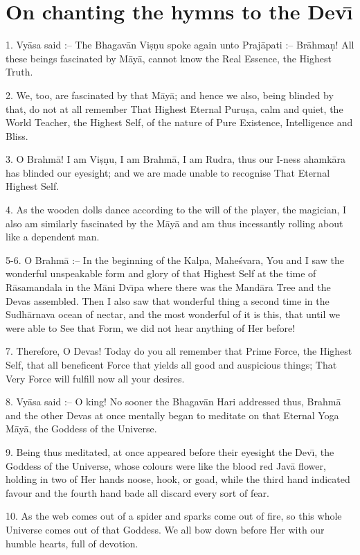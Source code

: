 \chapter{On chanting the hymns to the Dev\={\i}}

1. Vy\=asa said :-- The Bhagav\=an Vi\d{s}\d{n}u spoke again unto Praj\=apati :-- Br\=ahma\d{n}! All these beings fascinated by M\=ay\=a, cannot know the Real Essence, the Highest Truth.

2. We, too, are fascinated by that M\=ay\=a; and hence we also, being blinded by that, do not at all remember That Highest Eternal Puru\d{s}a, calm and quiet, the World Teacher, the Highest Self, of the nature of Pure Existence, Intelligence and Bliss.

3. O Brahm\=a! I am Vi\d{s}\d{n}u, I am Brahm\=a, I am Rudra, thus our I-ness ahamk\=ara has blinded our eyesight; and we are made unable to recognise That Eternal Highest Self.

4. As the wooden dolls dance according to the will of the player, the magician, I also am similarly fascinated by the M\=ay\=a and am thus incessantly rolling about like a dependent man.

5-6. O Brahm\=a :-- In the beginning of the Kalpa, Mahe\'svara, You and I saw the wonderful unspeakable form and glory of that Highest Self at the time of R\=asamandala in the M\=ani Dv\={\i}pa where there was the Mand\=ara Tree and the Devas assembled. Then I also saw that wonderful thing a second time in the Sudh\=arnava ocean of nectar, and the most wonderful of it is this, that until we were able to See that Form, we did not hear anything of Her before!

7. Therefore, O Devas! Today do you all remember that Prime Force, the Highest Self, that all beneficent Force that yields all good and auspicious things; That Very Force will fulfill now all your desires.

8. Vy\=asa said :-- O king! No sooner the Bhagav\=an Hari addressed thus, Brahm\=a and the other Devas at once mentally began to meditate on that Eternal Yoga M\=ay\=a, the Goddess of the Universe.

9. Being thus meditated, at once appeared before their eyesight the Dev\={\i}, the Goddess of the Universe, whose colours were like the blood red Jav\=a flower, holding in two of Her hands noose, hook, or goad, while the third hand indicated favour and the fourth hand bade all discard every sort of fear.

10. As the web comes out of a spider and sparks come out of fire, so this whole Universe comes out of that Goddess. We all bow down before Her with our humble hearts, full of devotion.

